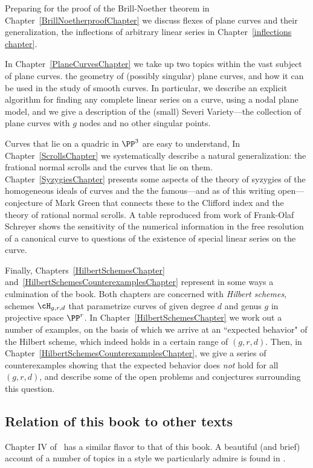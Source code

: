 Preparing for the proof of the Brill-Noether theorem in Chapter~\ref{BrillNoetherproofChapter} we discuss flexes of plane curves and their 
generalization, the inflections of arbitrary linear series in Chapter~\ref{inflections chapter}. 

In Chapter~\ref{PlaneCurvesChapter} we take up two topics within the vast subject  of plane curves. the geometry of (possibly singular) plane curves, and how it can be used in the study of smooth curves. In particular, we describe an explicit algorithm for finding any complete linear series on a curve, using a nodal plane model, and we give a description of the 
(small) Severi Variety---the collection of plane curves with $g$ nodes and no other singular points.

Curves that lie on a quadric in $\PP^3$ are easy to understand, In Chapter~\ref{ScrollsChapter} we systematically describe a natural generalization: the frational normal scrolls and the curves that lie on them. Chapter~\ref{SyzygiesChapter} presents some aspects of the theory of syzygies of the homogeneous ideals of curves and the the famous---and as of this writing open---conjecture of Mark Green that connects these to the Clifford index and the theory of rational normal scrolls. A table reproduced from work of Frank-Olaf Schreyer shows the sensitivity of the numerical information in the free resolution of a canonical curve to questions of the existence of special linear series on the curve.

 Finally, Chapters~\ref{HilbertSchemesChapter} and~\ref{HilbertSchemesCounterexamplesChapter} represent in some ways a culmination of the book. Both chapters are concerned with \emph{Hilbert schemes}, schemes $\cH_{g,r,d}$ that parametrize curves of given degree $d$ and genus $g$ in projective space $\PP^r$. In Chapter~\ref{HilbertSchemesChapter} we work out a number of examples, on the basis of which we arrive at an ``expected behavior" of the Hilbert scheme, which indeed holds in a certain range of $(g,r,d)$. Then, in Chapter~\ref{HilbertSchemesCounterexamplesChapter}, we give a series of counterexamples showing that the expected behavior does \emph{not} hold for all $(g,r,d)$, and describe some of the open problems and conjectures surrounding this question.



\subsection{Relation of this book to other texts} 
Chapter IV of~\cite{Hartshorne1977} has a similar flavor to that of this book. A beautiful (and brief) account of a number of topics in a style we particularly admire is found in \cite{MumfordCJ}.

